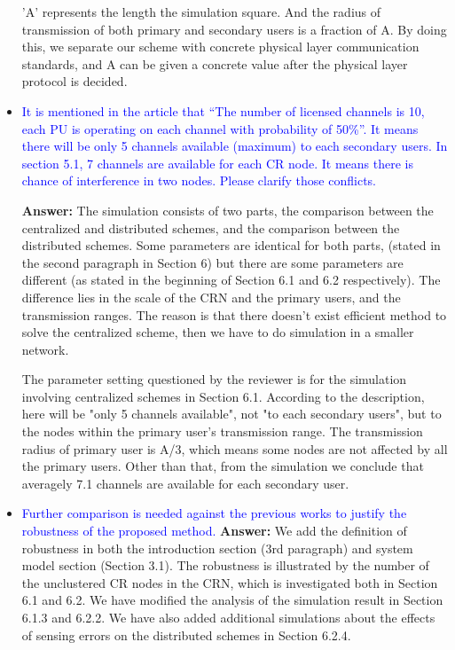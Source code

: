 \documentclass[10pt,a4paper]{article}
\begin{document}
\begin{itemize}
 'A' represents the length the simulation square.
    And the radius of transmission of both primary and secondary users is a fraction of A.
    By doing this, we separate our scheme with concrete physical layer communication standards, and A can be given a concrete value after the physical layer protocol is decided.
    
\item \textcolor{blue}{ It is mentioned in the article that “The number of licensed channels is 10, each PU is operating on each channel with probability of 50\%”. It means there will be only 5 channels available (maximum) to each secondary users. In section 5.1, 7 channels are available for each CR node. It means there is chance of interference in two nodes. Please clarify those conflicts.}

\textbf{Answer:} 
The simulation consists of two parts, the comparison between the centralized and distributed schemes, and the comparison between the distributed schemes.
Some parameters are identical for both parts, (stated in the second paragraph in Section 6) but there are some parameters are different (as stated in the beginning of Section 6.1 and 6.2 respectively).
The difference lies in the scale of the CRN and the primary users, and the transmission ranges.
The reason is that there doesn't exist efficient method to solve the centralized scheme, then we have to do simulation in a smaller network.

The parameter setting questioned by the reviewer is for the simulation involving centralized schemes in Section 6.1.
According to the description, here will be "only 5 channels available", not "to each secondary users", but to the nodes within the primary user's transmission range.
    The transmission radius of primary user is A/3, which means some nodes are not affected by all the primary users.
    Other than that, from the simulation we conclude that averagely 7.1 channels are available for each secondary user.
    
\item \textcolor{blue}{ Further comparison is needed against the previous works to justify the robustness of the proposed method.}
\textbf{Answer:} 	We add the definition of robustness in both the introduction section (3rd paragraph) and system model section (Section 3.1).
The robustness is illustrated by the number of the unclustered CR nodes in the CRN, which is investigated both in Section 6.1 and 6.2.
We have modified the analysis of the simulation result in Section 6.1.3 and 6.2.2.
We have also added additional simulations about the effects of sensing errors on the distributed schemes in Section 6.2.4.

\end{itemize}
\end{document}
